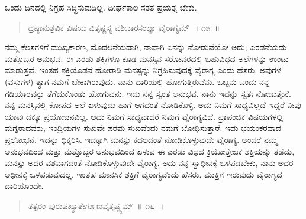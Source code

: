 \vspace{0.1cm}

ಒಂದು ದಿನದಲ್ಲಿ ನಿಗ್ರಹ ಸಿದ್ಧಿಸುವುದಿಲ್ಲ. ದೀರ್ಘಕಾಲ ಸತತ ಪ್ರಯತ್ನ ಬೇಕು. 

\vspace{-0.2cm}

\begin{verse}
ದ್ರಷ್ಠಾನುಶ್ರವಿಕ ವಿಷಯ ವಿತೃಷ್ಣಸ್ಯ ವಶೀಕಾರಸಂಜ್ಞಾ ವೈರಾಗ್ಯಮ್​~॥ ೧೫~॥
\end{verse}

\vspace{-0.4cm}


\vspace{0.1cm}

ನಮ್ಮ ಕೆಲಸಗಳಿಗೆ ಮುಖ್ಯಕಾರಣ, ಮೊದಲನೆಯದಾಗಿ, ನಾವಾಗಿ ಏನನ್ನು ನೋಡು\break ವೆಯೋ ಅದು; ಎರಡನೆಯದು ಮತ್ತೊಬ್ಬರ ಅನುಭವ. ಈ ಎರಡು ಶಕ್ತಿಗಳೂ ಕೂಡ ಮನಸ್ಸಿನ ಸರೋವರದಲ್ಲಿ ಬಹುವಿಧದ ಅಲೆಗಳನ್ನು ಉಂಟು ಮಾಡುತ್ತವೆ. ಇಂತಹ ಶಕ್ತಿಯೊಡನೆ ಹೋರಾಡಿ ಮನಸ್ಸನ್ನು ನಿಗ್ರಹಿಸುವುದಕ್ಕೆ ವೈರಾಗ್ಯ ಎಂದು ಹೆಸರು. ಅವುಗಳ (ವಸ್ತುಗಳ) ತ್ಯಾಗ ನಮಗೆ ಬೇಕಾಗಿರುವುದು. ನಾನು ದಾರಿಯಲ್ಲಿ ಹೋಗುತ್ತಿರುವೆನು. ಒಬ್ಬನು ಬಂದು ನನ್ನ ಗಡಿಯಾರವನ್ನು ತೆಗೆದುಕೊಂಡು ಹೋಗುವನು. ಇದು ನನ್ನ ಸ್ವಂತ ಅನುಭವ. ನಾನು ಇದನ್ನು ಸ್ವತಃ ನೋಡುತ್ತೇನೆ. ನನ್ನ ಮನಸ್ಸಿನಲ್ಲಿ ಕೋಪದ ಅಲೆ ಏಳುವುದು ಹಾಗೆ ಆಗದಂತೆ ನೋಡಿಕೊಳ್ಳಿ. ಅದು ನಿಮಗೆ ಸಾಧ್ಯವಿಲ್ಲದೆ ಇದ್ದರೆ ನೀವು ಯಾವು ದಕ್ಕೂ ಪ್ರಯೋಜನವಿಲ್ಲ. ಅದು ನಿಮಗೆ ಸಾಧ್ಯವಾದರೆ ನಿಮಗೆ ವೈರಾಗ್ಯವಿದೆ. ಪ್ರಾಪಂಚಿಕ ವಿಷಯಗಳಲ್ಲಿ ಮಗ್ನರಾದವರು, ಇಂದ್ರಿಯಗಳ ಸುಖವೇ ಪರಮ ಸುಖವೆಂದು ನಮಗೆ ಬೋಧಿಸುತ್ತಾರೆ. ಇದು ಭಯಂಕರವಾದ ಪ್ರಲೋಭನೆ. ಇದನ್ನು ಧಿಕ್ಕರಿಸಿ. ಇದಕ್ಕಾಗಿ ಮನಸ್ಸು ಕದಲದಂತೆ ನೋಡಿಕೊಳ್ಳುವುದೇ ವೈರಾಗ್ಯ. ಅಂದರೆ ನಮ್ಮ ಅನುಭವದಿಂದ ಮತ್ತು ಮತ್ತೊಬ್ಬರ ಅನುಭವದಿಂದ ಏಳುವ ಈ ಎರಡು ವಿಧದ ಕ್ರಿಯೋತ್ತೇಜಕ ಶಕ್ತಿಯನ್ನು ತಡೆದು, ಮನಸ್ಸು ಅದರ ವಶವಾಗದಂತೆ ನೋಡಿಕೊಳ್ಳುವುದೇ ವೈರಾಗ್ಯ. ಅದು ನನ್ನ ಸ್ವಾಧೀನಕ್ಕೆ ಒಳಪಡಬೇಕು, ನಾನು ಅದರ ಅಧೀನಕ್ಕೆ ಒಳಪಡುವುದಲ್ಲ. ಇಂತಹ ಮಾನಸಿಕ ಶಕ್ತಿಗೆ ವೈರಾಗ್ಯವೆಂದು ಹೆಸರು. ಮುಕ್ತಿಗೆ ಇರುವುದು ವೈರಾಗ್ಯದ ದಾರಿಯೊಂದೇ. 

\vspace{-0.2cm}

\begin{verse}
ತತ್ಪರಂ ಪುರುಷಖ್ಯಾತೇರ್ಗುಣವೈತೃಷ್ಣ್ಯಮ್​~॥ ೧೬~॥
\end{verse}

\vspace{-0.4cm}


